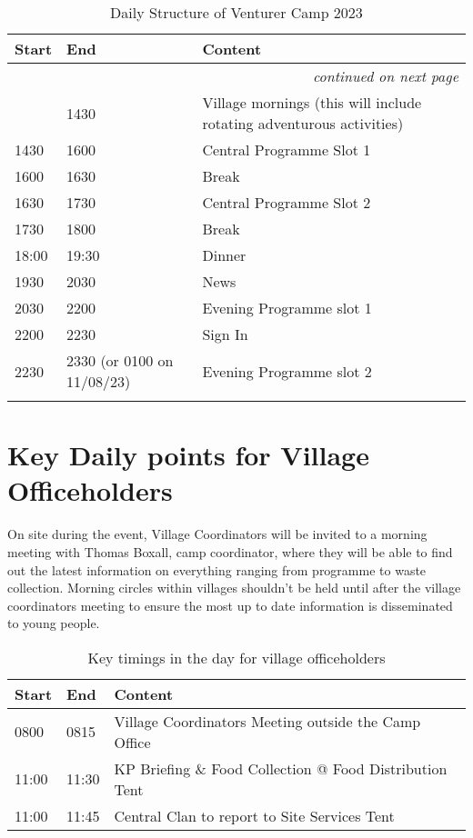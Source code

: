 \documentclass[a4paper, 11pt]{report}
\begin{document}
{\RaggedRight \centering
\begin{longtable}{p{} p{} p{}}
\textbf{Start} & \textbf{End} & \textbf{Content} \\ 
\hline
\endhead

\multicolumn{3}{r}{\footnotesize\itshape continued on next page}\\
\endfoot 

\endlastfoot

& 1430 & Village mornings (this will include rotating adventurous activities) \\ 
\hline
1430 & 1600 & Central Programme Slot 1 \\ 
\hline
1600 & 1630 & Break \\ 
\hline
1630 & 1730 & Central Programme Slot 2 \\ 
\hline
1730 & 1800 & Break \\ 
\hline
18:00 & 19:30 & Dinner \\ 
\hline
1930 & 2030 & News \\ 
\hline
2030 & 2200 & Evening Programme slot 1 \\ 
\hline
2200 & 2230 & Sign In \\ 
\hline
2230 & 2330 (or 0100 on 11/08/23) & Evening Programme slot 2 \\ 
\hline

\caption{Daily Structure of Venturer Camp 2023}
\end{longtable}
}%

\section{Key Daily points for Village Officeholders}
On site during the event, Village Coordinators will be invited to a morning meeting with Thomas Boxall, camp coordinator, where they will be able to find out the latest information on everything ranging from programme to waste collection. Morning circles within villages shouldn't be held until after the village coordinators meeting to ensure the most up to date information is disseminated to young people. 
\begin{table}[H]
    \centering
    {\RaggedRight
    \begin{tabular}{p{} p{} p{}}
        \textbf{Start} & \textbf{End} & \textbf{Content} \\
        \hline
        0800 & 0815 & Village Coordinators Meeting outside the Camp Office \\
        \hline
        11:00 & 11:30 & KP Briefing \& Food Collection @ Food Distribution Tent \\
        \hline
        11:00 & 11:45 & Central Clan to report to Site Services Tent\\
        \hline
    \end{tabular}
    }%
    \caption{Key timings in the day for village officeholders}
\end{table}
\end{document}
